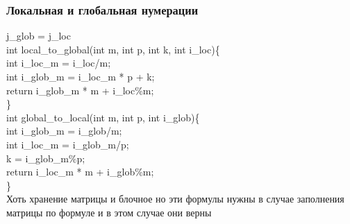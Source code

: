 \documentclass[a4paper,12pt]{article}
\begin{document}
\subsubsection{Локальная и глобальная нумерации}
j\_glob = j\_loc\\
int local\_to\_global(int m, int p, int k, int i\_loc)\{ \\
      int i\_loc\_m = i\_loc/m;\\
      int i\_glob\_m = i\_loc\_m * p + k;\\
      return i\_glob\_m * m + i\_loc\%m;\\
\}\\
int global\_to\_local(int m, int p, int i\_glob)\{\\
  int i\_glob\_m = i\_glob/m;\\
  int i\_loc\_m = i\_glob\_m/p;\\
  k = i\_glob\_m\%p;\\
  return i\_loc\_m * m + i\_glob\%m;\\
\}\\
Хоть хранение матрицы и блочное но эти формулы нужны в случае заполнения матрицы по формуле и в этом случае они верны\\
\end{document}
